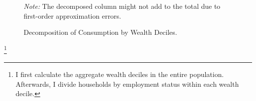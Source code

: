 


\begin{figure}[H]
\caption[Caption for LOF]{Decomposition of Consumption by Wealth Deciles. }
\label{fig:baseline_C_decomp_disagg}
\centering
\scriptsize 
\emph{Note:} The decomposed column might not add to the total due to first-order approximation errors.  
\end{figure}


\footnote{I first calculate the aggregate wealth deciles in the entire population. Afterwards, I divide households by employment status within each wealth decile. }


